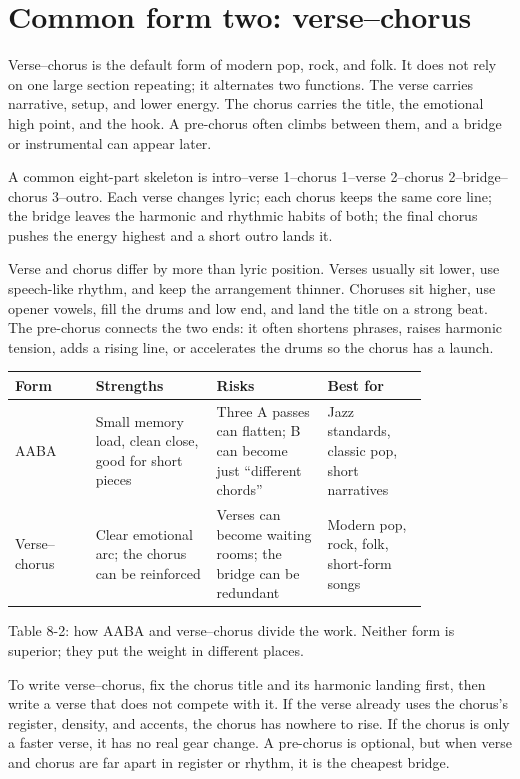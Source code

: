 \section{Common form two: verse--chorus}

Verse--chorus is the default form of modern pop, rock, and folk. It does not rely on one large section repeating; it alternates two functions. The verse carries narrative, setup, and lower energy. The chorus carries the title, the emotional high point, and the hook. A pre-chorus often climbs between them, and a bridge or instrumental can appear later.

A common eight-part skeleton is intro--verse 1--chorus 1--verse 2--chorus 2--bridge--chorus 3--outro. Each verse changes lyric; each chorus keeps the same core line; the bridge leaves the harmonic and rhythmic habits of both; the final chorus pushes the energy highest and a short outro lands it.

Verse and chorus differ by more than lyric position. Verses usually sit lower, use speech-like rhythm, and keep the arrangement thinner. Choruses sit higher, use opener vowels, fill the drums and low end, and land the title on a strong beat. The pre-chorus connects the two ends: it often shortens phrases, raises harmonic tension, adds a rising line, or accelerates the drums so the chorus has a launch.

\begin{center}
\small
\begin{tabular}{p{0.16\linewidth}p{0.24\linewidth}p{0.22\linewidth}p{0.20\linewidth}}
\toprule
Form & Strengths & Risks & Best for \\
\midrule
AABA & Small memory load, clean close, good for short pieces & Three A passes can flatten; B can become just ``different chords'' & Jazz standards, classic pop, short narratives \\
Verse--chorus & Clear emotional arc; the chorus can be reinforced & Verses can become waiting rooms; the bridge can be redundant & Modern pop, rock, folk, short-form songs \\
\bottomrule
\end{tabular}

Table 8-2: how AABA and verse--chorus divide the work. Neither form is superior; they put the weight in different places.
\end{center}

To write verse--chorus, fix the chorus title and its harmonic landing first, then write a verse that does not compete with it. If the verse already uses the chorus's register, density, and accents, the chorus has nowhere to rise. If the chorus is only a faster verse, it has no real gear change. A pre-chorus is optional, but when verse and chorus are far apart in register or rhythm, it is the cheapest bridge.


